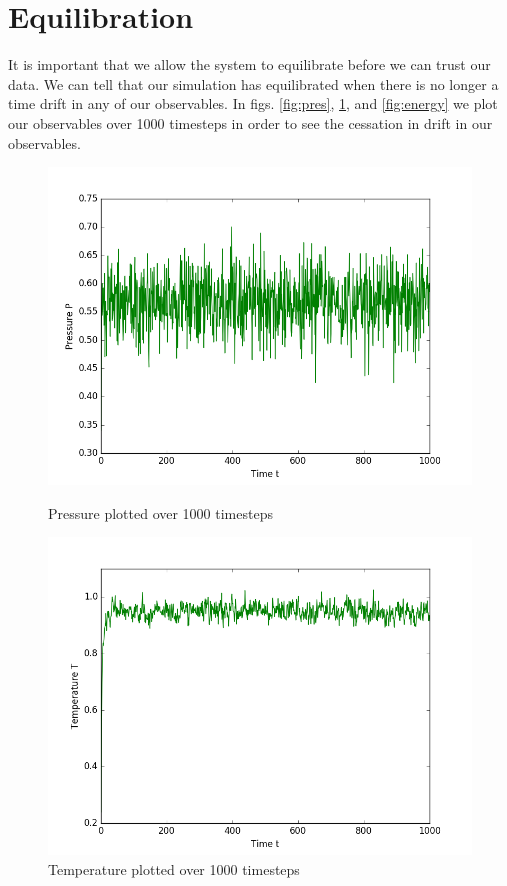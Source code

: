 \section{Equilibration}
It is important that we allow the system to equilibrate before we can trust our data. We can tell that our simulation has equilibrated when there is no longer a time drift in any of our observables. In figs. \ref{fig:pres}, \ref{fig:temp}, and \ref{fig:energy} we plot our observables over 1000 timesteps in order to see the cessation in drift in our observables.
\begin{figure}[h]
  \includegraphics[width=\linewidth]{fig/Pressure.png}
  \caption{Pressure plotted over 1000 timesteps}\label{fig:pres}
\endminipage\hfill
{}
  \includegraphics[width=\linewidth]{fig/Temperature.png}
  \caption{Temperature plotted over 1000 timesteps}\label{fig:temp}
\endminipage
\end{figure}
